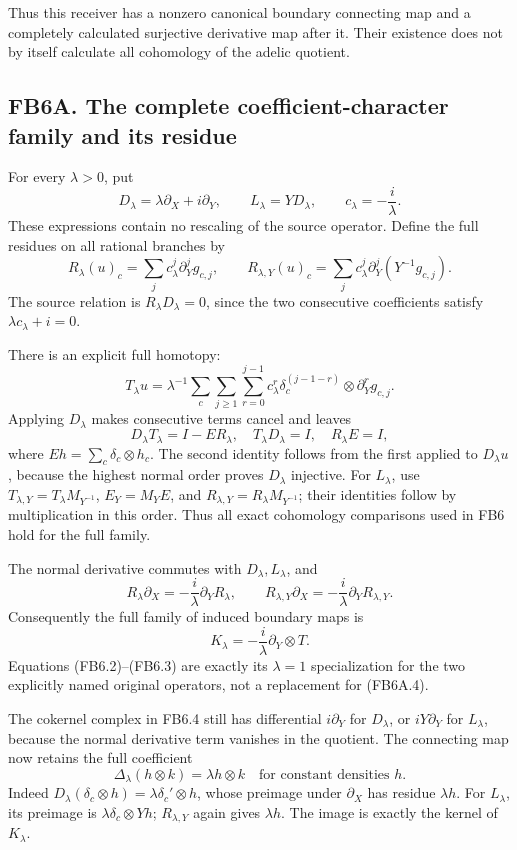 Thus this receiver has a nonzero canonical boundary connecting map and a
completely calculated surjective derivative map after it. Their
existence does not by itself calculate all cohomology of the adelic
quotient.

\subsection{FB6A. The complete coefficient-character family and its
residue}\label{fb6a.-the-complete-coefficient-character-family-and-its-residue}

For every \(\lambda>0\), put \[
D_\lambda=\lambda\partial_X+i\partial_Y,\qquad
L_\lambda=YD_\lambda,\qquad
c_\lambda=-\frac{i}{\lambda}.
\] These expressions contain no rescaling of the source operator. Define
the full residues on all rational branches by \[
R_\lambda(u)_c=\sum_jc_\lambda^j\partial_Y^jg_{c,j},
\qquad
R_{\lambda,Y}(u)_c
=\sum_jc_\lambda^j\partial_Y^j(Y^{-1}g_{c,j}).
\tag{FB6A.1}
\] The source relation is \(R_\lambda D_\lambda=0\), since the two
consecutive coefficients satisfy \(\lambda c_\lambda+i=0\).

There is an explicit full homotopy: \[
T_\lambda u
=\lambda^{-1}\sum_c\sum_{j\ge1}\sum_{r=0}^{j-1}
c_\lambda^r\delta_c^{(j-1-r)}\otimes\partial_Y^rg_{c,j}.
\tag{FB6A.2}
\] Applying \(D_\lambda\) makes consecutive terms cancel and leaves \[
D_\lambda T_\lambda=I-ER_\lambda,\quad
T_\lambda D_\lambda=I,\quad R_\lambda E=I,
\] where \(Eh=\sum_c\delta_c\otimes h_c\). The second identity follows
from the first applied to \(D_\lambda u\), because the highest normal
order proves \(D_\lambda\) injective. For \(L_\lambda\), use
\(T_{\lambda,Y}=T_\lambda M_{Y^{-1}}\), \(E_Y=M_YE\), and
\(R_{\lambda,Y}=R_\lambda M_{Y^{-1}}\); their identities follow by
multiplication in this order. Thus all exact cohomology comparisons used
in FB6 hold for the full family.

The normal derivative commutes with \(D_\lambda,L_\lambda\), and \[
R_\lambda\partial_X
=-\frac{i}{\lambda}\partial_YR_\lambda,\qquad
R_{\lambda,Y}\partial_X
=-\frac{i}{\lambda}\partial_YR_{\lambda,Y}.
\tag{FB6A.3}
\] Consequently the full family of induced boundary maps is \[
\boxed{K_\lambda=-\frac{i}{\lambda}\partial_Y\otimes T.}
\tag{FB6A.4}
\] Equations (FB6.2)--(FB6.3) are exactly its \(\lambda=1\)
specialization for the two explicitly named original operators, not a
replacement for (FB6A.4).

The cokernel complex in FB6.4 still has differential \(i\partial_Y\) for
\(D_\lambda\), or \(iY\partial_Y\) for \(L_\lambda\), because the normal
derivative term vanishes in the quotient. The connecting map now retains
the full coefficient \[
\boxed{\Delta_\lambda(h\otimes k)=\lambda h\otimes k
\quad\text{for constant densities }h.}
\tag{FB6A.5}
\] Indeed \(D_\lambda(\delta_c\otimes h)=\lambda\delta_c'\otimes h\),
whose preimage under \(\partial_X\) has residue \(\lambda h\). For
\(L_\lambda\), its preimage is \(\lambda\delta_c\otimes Yh\);
\(R_{\lambda,Y}\) again gives \(\lambda h\). The image is exactly the
kernel of \(K_\lambda\).

